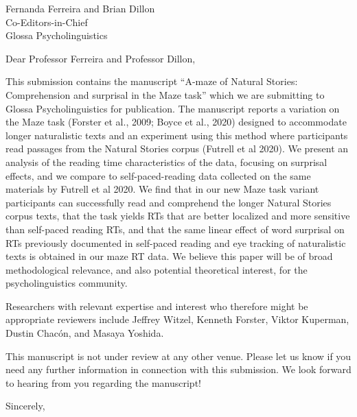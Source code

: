 \documentclass{stanfordletter}
\begin{document}
	\signature{Veronica Boyce \\ Roger Levy}
	
	
	\begin{letter}{Fernanda Ferreira and Brian Dillon \\ Co-Editors-in-Chief \\ Glossa Psycholinguistics}
		
		
          \opening{Dear Professor Ferreira and Professor Dillon,} This
          submission contains the manuscript ``A-maze of Natural
          Stories: Comprehension and surprisal in the Maze task''
          which we are submitting to Glossa Psycholinguistics for
          publication. The manuscript reports a variation on the Maze
          task (Forster et al., 2009; Boyce et al., 2020) designed to
          accommodate longer naturalistic texts and an experiment
          using this method where participants read passages from the
          Natural Stories corpus (Futrell et al 2020). We present an
          analysis of the reading time characteristics of the data,
          focusing on surprisal effects, and we compare to
          self-paced-reading data collected on the same materials by
          Futrell et al 2020. We find that in our new Maze task
          variant participants can successfully read and comprehend
          the longer Natural Stories corpus texts, that the task
          yields RTs that are better localized and more sensitive than
          self-paced reading RTs, and that the same linear effect of
          word surprisal on RTs previously documented in self-paced
          reading and eye tracking of naturalistic texts is obtained
          in our maze RT data. We believe this paper will be of broad
          methodological relevance, and also potential theoretical
          interest, for the psycholinguistics community.
		 
          Researchers with relevant expertise and interest who
          therefore might be appropriate reviewers include Jeffrey
          Witzel, Kenneth Forster, Viktor Kuperman, Dustin Chac{\'o}n,
          and Masaya Yoshida.
		 
          This manuscript is not under review at any other
          venue. Please let us know if you need any further
          information in connection with this submission. We look
          forward to hearing from you regarding the manuscript!
          \closing{Sincerely,}
		
	\end{letter}
	
\end{document}
